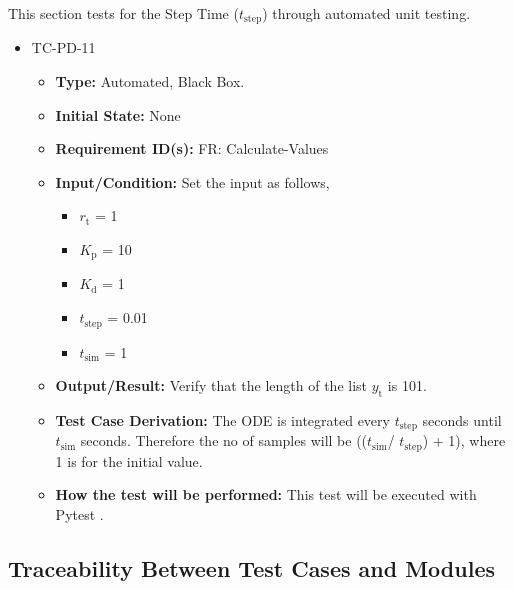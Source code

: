 \documentclass[12pt, titlepage]{article}
\begin{document}
This section tests for the Step Time (${t_{\text{step}}}$) through automated unit testing.

\begin{itemize}
\item{TC-PD-11\\}
\begin{itemize}

\item{\textbf{Type:}}  Automated, Black Box.
					
\item{\textbf{Initial State:}} None

\item{\textbf{Requirement ID(s):}}  FR: Calculate-Values
					
\item{\textbf{Input/Condition:}}  Set the input as follows,

\begin{itemize}
\item ${r_{\text{t}}}$ = 1
\item ${K_{\text{p}}}$ = 10
\item ${K_{\text{d}}}$ = 1
\item ${t_{\text{step}}}$ = 0.01
\item ${t_{\text{sim}}}$ = 1 
\end{itemize}

\item{\textbf{Output/Result:}} Verify that the length of the list ${y_{\text{t}}}$ is 101.

\item{\textbf{Test Case Derivation:}} The ODE is integrated every  ${t_{\text{step}}}$ seconds 
until  ${t_{\text{sim}}}$ seconds. Therefore the no of samples will be  
((${t_{\text{sim}}}$/ ${t_{\text{step}}}$) + 1), where 1 is for the initial value.

\item{\textbf{How the test will be performed:}}  This test will be executed with Pytest \cite{Pytest}.

\end{itemize}
\end{itemize}

					
\subsection{Traceability Between Test Cases and Modules}

				
\end{document}

